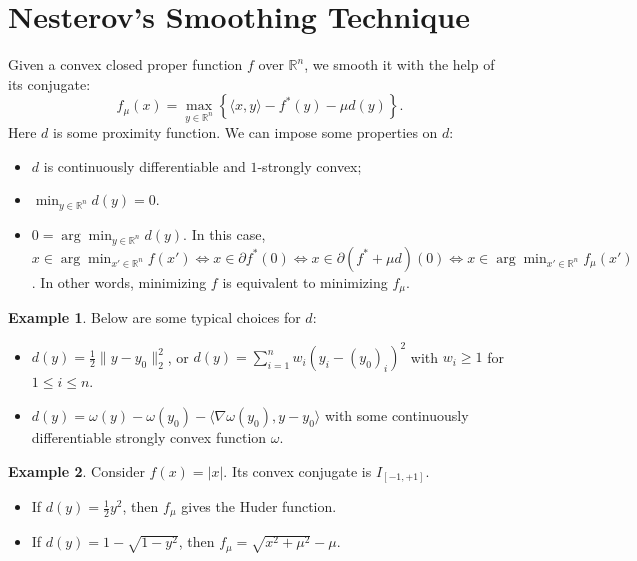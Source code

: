 \documentclass[openany]{book}
\theoremstyle{definition}
\newtheorem{example}{Example}[chapter]
\theoremstyle{remark}
\begin{document}
\section{Nesterov's Smoothing Technique}
Given a convex closed proper function $f$ over $\mathbb{R}^n$, we smooth it with the help of its conjugate:
\begin{equation}\label{NesterovSmooth}
    f_{\mu}(x)=\max_{y\in \mathbb{R}^n}\left\{\langle x,y\rangle-f^*(y)-\mu d(y)\right\}.
\end{equation}
Here $d$ is some proximity function. We can impose some properties on $d$:
\begin{itemize}
    \item $d$ is continuously differentiable and $1$-strongly convex;
    \item $\min_{y\in \mathbb{R}^n}d(y)=0$.
    \item $0=\arg\min_{y\in \mathbb{R}^n}d(y)$. In this case, $x\in\arg\min_{x'\in \mathbb{R}^n}f(x')\iff x\in\partial f^*(0)\iff x\in\partial (f^*+\mu d)(0)\iff x\in\arg\min_{x'\in \mathbb{R}^n}f_{\mu}(x')$. In other words, minimizing $f$ is equivalent to minimizing $f_{\mu}$.
\end{itemize}

\begin{example}
    Below are some typical choices for $d$:
    \begin{itemize}
        \item $d(y)=\frac{1}{2}\|y-y_0\|_2^2$, or $d(y)=\sum_{i=1}^{n}w_i(y_i-(y_0)_i)^2$ with $w_i\ge1$ for $1\le i\le n$.
        \item $d(y)=\omega(y)-\omega(y_0)-\langle\nabla\omega(y_0),y-y_0\rangle$ with some continuously differentiable strongly convex function $\omega$.
    \end{itemize}
\end{example}

\begin{example}
    Consider $f(x)=|x|$. Its convex conjugate is $I_{[-1,+1]}$.
    \begin{itemize}
        \item If $d(y)=\frac{1}{2}y^2$, then $f_{\mu}$ gives the Huder function.
        \item If $d(y)=1-\sqrt{1-y^2}$, then $f_{\mu}=\sqrt{x^2+\mu^2}-\mu$.
    \end{itemize}
\end{example}
\end{document}
